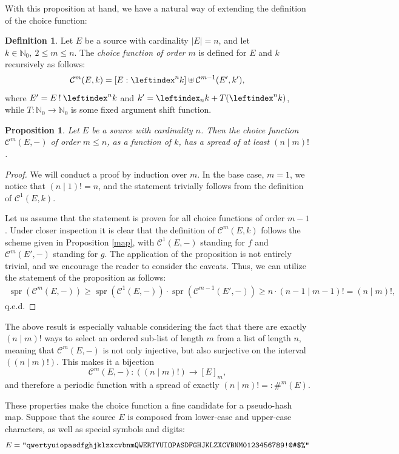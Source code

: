 \documentclass[a4paper, 10pt]{article}
\theoremstyle{plain}
\newtheorem{proposition}[theorem]{Proposition}
\theoremstyle{definition}
\newtheorem{definition}[theorem]{Definition}
\newcommand{\N}{\mathbb{N}}
\newcommand{\wo}{\mathbin{!}}
\newcommand{\li}{\leftindex}
\newcommand{\rf}[2]{(#1 \mathbin{\mid} #2)!}
\newcommand{\spr}[1]{\operatorname{spr}(#1)}
\newcommand{\cc}{\mathcal{C}}
\begin{document}
With this proposition at hand, we have a natural way of extending the definition of the choice function:\\

\begin{definition}
  Let $E$ be a source with cardinality $|E| = n$, and let $k \in \N_0,\ 2 \le m \le n$. The \emph{choice function of order $m$} is defined for $E$ and $k$ recursively as follows:
  \[
    \cc^m (E,k) = [E : \li^n k] \uplus \cc^{m-1}(E', k'),
  \]
  where $E' = E \wo \li^n k$ and $k' = \li_n k + T(\li^n k)$, while $T \colon \N_0 \to \N_0$ is some fixed argument shift function.\\
\end{definition}

\begin{proposition}
  Let $E$ be a source with cardinality $n$. Then the choice function $\cc^m(E,-)$ of order $m \le n$, as a function of $k$, has a spread of at least $\rf{n}{m}$.
\end{proposition}
\begin{proof}
  We will conduct a proof by induction over $m$. In the base case, $m = 1$, we notice that $\rf{n}{1} = n$, and the statement trivially follows from the definition of $\cc^1(E,k)$.

  Let us assume that the statement is proven for all choice functions of order $m-1$. Under closer inspection it is clear that the definition of $\cc^m(E, k)$ follows the scheme given in Proposition \ref{map}, with $\cc^1(E,-)$ standing for $f$ and $\cc^m(E', -)$ standing for $g$. The application of the proposition is not entirely trivial, and we encourage the reader to consider the caveats. Thus, we can utilize the statement of the proposition as follows:
  \begin{align*}
    \spr{\cc^m(E,-)} \ge \spr{\cc^1(E, -)} \cdot \spr{\cc^{m-1}(E', -)} \ge n \cdot \rf{n-1}{m-1} = \rf{n}{m},
  \end{align*}
  q.e.d.
\end{proof}

The above result is especially valuable considering the fact that there are exactly $\rf{n}{m}$ ways to select an ordered sub-list of length $m$ from a list of length $n$, meaning that $\cc^m(E,-)$ is not only injective, but also surjective on the interval $(\rf{n}{m})$. This makes it a bijection
\[
  \cc^m(E,-) \colon (\rf{n}{m}) \to [E]_m,
\]
and therefore a periodic function with a spread of exactly $\rf{n}{m} =: \#^m (E)$.

These properties make the choice function a fine candidate for a pseudo-hash map. Suppose that the source $E$ is composed from lower-case and upper-case characters, as well as special symbols and digits:
\[
  E = 
  \text{\texttt{"qwertyuiopasdfghjklzxcvbnmQWERTYUIOPASDFGHJKLZXCVBNM0123456789!@\#\$\%"}}
\]
\end{document}
